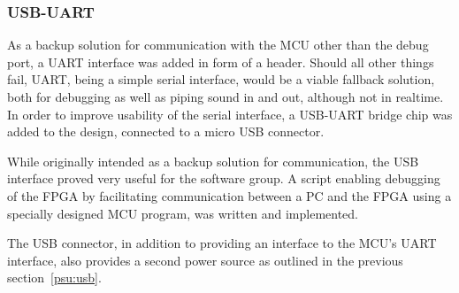 
\subsubsection{USB-UART}

As a backup solution for communication with the MCU other than the debug port,
a UART interface was added in form of a header. Should all other things fail,
UART, being a simple serial interface, would be a viable fallback solution, both
for debugging as well as piping sound in and out, although not in realtime. In
order to improve usability of the serial interface, a USB-UART bridge chip was
added to the design, connected to a micro USB connector.

While originally intended as a backup solution for communication, the USB
interface proved very useful for the software group. A script enabling debugging
of the FPGA by facilitating communication between a PC and the FPGA using a
specially designed MCU program, was written and implemented. 

The USB connector, in addition to providing an interface to the MCU's UART
interface, also provides a second power source as outlined in
the previous section~\ref{psu:usb}.
